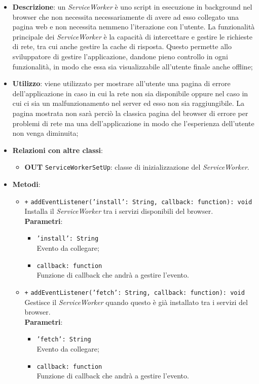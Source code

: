 		\begin{itemize}

			\item \textbf{Descrizione}: un \textit{ServiceWorker} è uno script in esecuzione in background nel browser che non necessita necessariamente di avere ad esso collegato una pagina web e non necessita nemmeno l'iterazione con l'utente. La funzionalità principale dei \textit{ServiceWorker} è la capacità di intercettare e gestire le richieste di rete, tra cui anche gestire la cache di risposta. 
			Questo permette allo sviluppatore di gestire l'applicazione, dandone pieno controllo in ogni funzionalità, in modo che essa sia visualizzabile all'utente finale anche offline;
			\item \textbf{Utilizzo}: viene utilizzato per mostrare all'utente una pagina di errore dell'applicazione in caso in cui la rete non sia disponibile oppure nel caso in cui ci sia un malfunzionamento nel server ed esso non sia raggiungibile. La pagina mostrata non sarà perciò la classica pagina del browser di errore per problemi di rete ma una dell'applicazione in modo che l'esperienza dell'utente non venga diminuita;
			\item \textbf{Relazioni con altre classi}:
			\begin{itemize}
				\item \textbf{OUT} \texttt{ServiceWorkerSetUp}: classe di inizializzazione del \textit{ServiceWorker}.
			\end{itemize}

			\item \textbf{Metodi}: 
			\begin{itemize}

				\item \texttt{+} \texttt{addEventListener('install': String, callback: function): void} \\ 
				Installa il \textit{ServiceWorker} tra i servizi disponibili del browser.
				\\
				\textbf{Parametri}:
				\begin{itemize}
					\item \texttt{'install': String}\\ Evento da collegare;
					\item \texttt{callback: function}\\ Funzione di callback che andrà a gestire l'evento.						
				\end{itemize}	
				\item \texttt{+} \texttt{addEventListener('fetch': String, callback: function): void} \\
				Gestisce il \textit{ServiceWorker} quando questo è già installato tra i servizi del browser.
				\\
				\textbf{Parametri}:
				\begin{itemize}
					\item \texttt{'fetch': String}\\ Evento da collegare;
					\item \texttt{callback: function}\\ Funzione di callback che andrà a gestire l'evento.						
				\end{itemize}	


\end{itemize}
\end{itemize}
